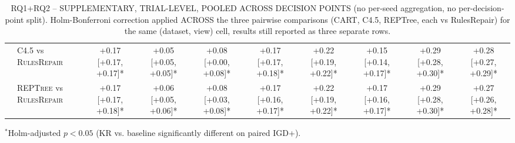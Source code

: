 \begin{table}[htbp]
{\begin{tabular}{llcccccccc}
 & \textsc{C4.5} vs \textsc{RulesRepair} & +0.17 [+0.17, +0.17]* & +0.05 [+0.05, +0.05]* & +0.08 [+0.00, +0.08]* & +0.17 [+0.17, +0.18]* & +0.22 [+0.19, +0.22]* & +0.15 [+0.14, +0.17]* & +0.29 [+0.28, +0.30]* & +0.28 [+0.27, +0.29]* \\
 & \textsc{REPTree} vs \textsc{RulesRepair} & +0.17 [+0.17, +0.18]* & +0.06 [+0.05, +0.06]* & +0.08 [+0.03, +0.08]* & +0.17 [+0.16, +0.17]* & +0.22 [+0.19, +0.22]* & +0.17 [+0.16, +0.17]* & +0.29 [+0.28, +0.30]* & +0.27 [+0.26, +0.28]* \\
\bottomrule
\end{tabular}
}
\vspace{2pt}
{\footnotesize $^*$Holm-adjusted $p < 0.05$ (KR vs. baseline significantly different on paired IGD+).}
\caption{RQ1+RQ2 -- SUPPLEMENTARY, TRIAL-LEVEL, POOLED ACROSS DECISION POINTS (no per-seed aggregation, no per-decision-point split). Holm-Bonferroni correction applied ACROSS the three pairwise comparisons (CART, C4.5, REPTree, each vs RulesRepair) for the same (dataset, view) cell, results still reported as three separate rows.}
\label{tab:rq12_unified_by_dataset}
\end{table}